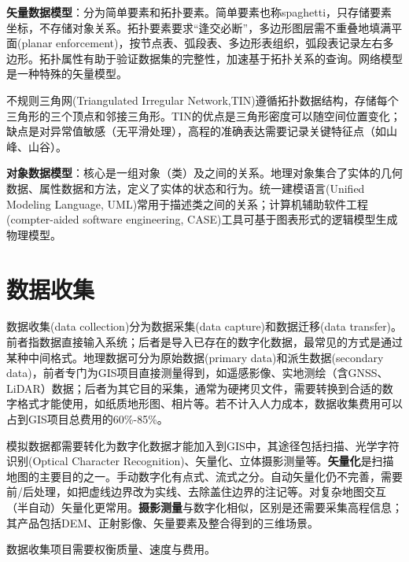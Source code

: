 \par \textbf{矢量数据模型}：分为简单要素和拓扑要素。简单要素也称spaghetti，只存储要素坐标，不存储对象关系。拓扑要素要求``逢交必断''，多边形图层需不重叠地填满平面(planar enforcement)，按节点表、弧段表、多边形表组织，弧段表记录左右多边形。拓扑属性有助于验证数据集的完整性，加速基于拓扑关系的查询。网络模型是一种特殊的矢量模型。
\par 不规则三角网(Triangulated Irregular Network,TIN)遵循拓扑数据结构，存储每个三角形的三个顶点和邻接三角形。TIN的优点是三角形密度可以随空间位置变化；缺点是对异常值敏感（无平滑处理），高程的准确表达需要记录关键特征点（如山峰、山谷）。

\par \textbf{对象数据模型}：核心是一组对象（类）及之间的关系。地理对象集合了实体的几何数据、属性数据和方法，定义了实体的状态和行为。统一建模语言(Unified Modeling Language, UML)常用于描述类之间的关系；计算机辅助软件工程(compter-aided software engineering, CASE)工具可基于图表形式的逻辑模型生成物理模型。

\section{数据收集}

\par 数据收集(data collection)分为数据采集(data capture)和数据迁移(data transfer)。前者指数据直接输入系统；后者是导入已存在的数字化数据，最常见的方式是通过某种中间格式。地理数据可分为原始数据(primary data)和派生数据(secondary data)，前者专门为GIS项目直接测量得到，如遥感影像、实地测绘（含GNSS、LiDAR）数据；后者为其它目的采集，通常为硬拷贝文件，需要转换到合适的数字格式才能使用，如纸质地形图、相片等。若不计入人力成本，数据收集费用可以占到GIS项目总费用的60\%-85\%。

\par 模拟数据都需要转化为数字化数据才能加入到GIS中，其途径包括扫描、光学字符识别(Optical Character Recognition)、矢量化、立体摄影测量等。\textbf{矢量化}是扫描地图的主要目的之一。手动数字化有点式、流式之分。自动矢量化仍不完善，需要前/后处理，如把虚线边界改为实线、去除盖住边界的注记等。对复杂地图交互（半自动）矢量化更常用。\textbf{摄影测量}与数字化相似，区别是还需要采集高程信息；其产品包括DEM、正射影像、矢量要素及整合得到的三维场景。

\par 数据收集项目需要权衡质量、速度与费用。

\par \vspace{6em}

